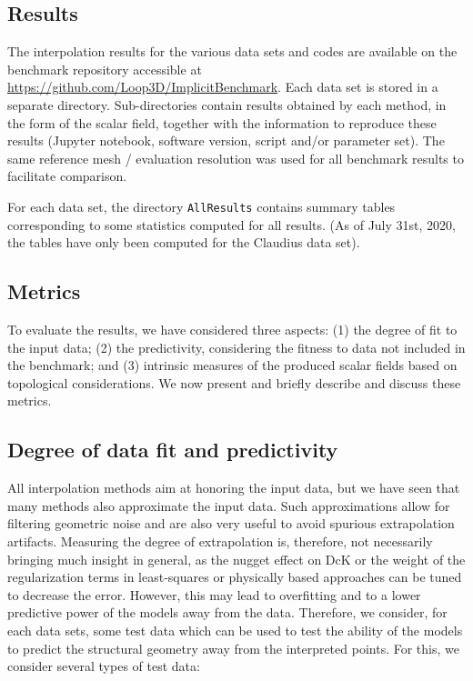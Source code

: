 \documentclass[final]{ring20}
\begin{document}
{\subsection{Results}
The interpolation results for the various data sets and codes are available on the benchmark repository accessible at \url{https://github.com/Loop3D/ImplicitBenchmark}. Each data set is stored in a separate directory. Sub-directories contain results obtained by each method, in the form of the scalar field, together with the information to reproduce these results (Jupyter notebook, software version, script and/or parameter set). The same reference mesh / evaluation resolution was used for all benchmark results to facilitate comparison. 

For each data set, the directory \texttt{AllResults} contains summary tables corresponding to some statistics computed for all results. (As of July 31st, 2020, the tables have only been computed for the Claudius data set). 

\subsection{Metrics}
To evaluate the results, we have considered three aspects: (1) the degree of fit to the input data; (2) the predictivity, considering the fitness to data not included in the benchmark; and (3) intrinsic measures of the produced scalar fields based on topological considerations. We now present and briefly describe and discuss these metrics. 

\subsection{Degree of data fit and predictivity}

All interpolation methods aim at honoring the input data, but we have seen that many methods also approximate the input data. Such approximations allow for filtering geometric noise and are also very useful to avoid spurious extrapolation artifacts. 
Measuring the degree of extrapolation is, therefore, not necessarily bringing much insight in general, as the nugget effect on DcK or the weight of the regularization terms in least-squares or physically based approaches can be tuned to decrease the error. However, this may lead to overfitting and to a lower predictive power of the models away from the data. Therefore, we consider, for each data sets, some test data which can be used to test the ability of the models to predict the structural geometry away from the interpreted points. For this, we consider several types of test data:

}
\end{document}
